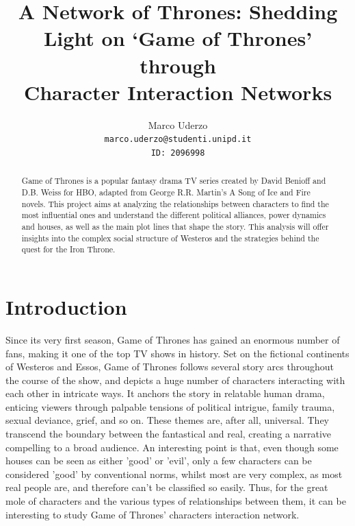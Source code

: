 \documentclass[10pt,twocolumn,letterpaper]{article}
\begin{document}
\title{A Network of Thrones: Shedding Light on `Game of Thrones' through \\Character Interaction Networks}

\author{Marco Uderzo\\
{\tt\small marco.uderzo@studenti.unipd.it} \\
{\tt\small ID: 2096998} \\
}


\maketitle

\begin{abstract}
Game of Thrones is a popular fantasy drama TV series created by David Benioff and D.B. Weiss for HBO, adapted from George R.R. Martin's A Song of Ice and Fire novels. This project aims at analyzing the relationships between characters to find the most influential ones and understand the different political alliances, power dynamics and houses, as well as the main plot lines that shape the story. This analysis will offer insights into the complex social structure of Westeros and the strategies behind the quest for the Iron Throne.
\end{abstract}

\section{Introduction}

Since its very first season, Game of Thrones has gained an enormous number of fans, making it one of the top TV shows in history. Set on the fictional continents of Westeros and Essos, Game of Thrones follows several story arcs throughout the course of the show, and depicts a huge number of characters interacting with each other in intricate ways. It anchors the story in relatable human drama, enticing viewers through palpable tensions of political intrigue, family trauma, sexual deviance, grief, and so on. These themes are, after all, universal. They transcend the boundary between the fantastical and real, creating a narrative compelling to a broad audience. An interesting point is that, even though some houses can be seen as either 'good' or 'evil', only a few characters can be considered 'good' by conventional norms, whilst most are very complex, as most real people are, and therefore can't be classified so easily.
Thus, for the great mole of characters and the various types of relationships between them, it can be interesting to study Game of Thrones' characters interaction network.
\end{document}
